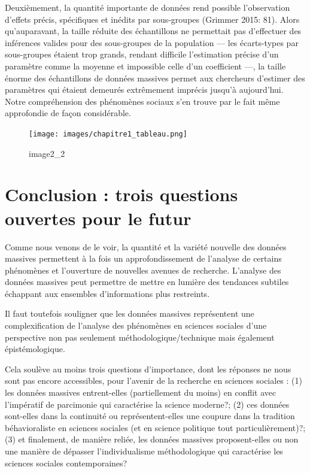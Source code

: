 \documentclass[
  letterpaper,
  DIV=11,
  numbers=noendperiod]{scrreprt}
\begin{document}
Deuxièmement, la quantité importante de données rend possible
l'observation d'effets précis, spécifiques et inédits par sous-groupes
(Grimmer 2015: 81). Alors qu'auparavant, la taille réduite des
échantillons ne permettait pas d'effectuer des inférences valides pour
des sous-groupes de la population --- les écarts-types par sous-groupes
étaient trop grands, rendant difficile l'estimation précise d'un
paramètre comme la moyenne et impossible celle d'un coefficient ---, la
taille énorme des échantillons de données massives permet aux chercheurs
d'estimer des paramètres qui étaient demeurés extrêmement imprécis
jusqu'à aujourd'hui. Notre compréhension des phénomènes sociaux s'en
trouve par le fait même approfondie de façon considérable.

\begin{figure}

{\centering \texttt{[image: images/chapitre1\_tableau.png]}

}

\caption{image2\_2}

\end{figure}

\hypertarget{conclusion-trois-questions-ouvertes-pour-le-futur}{%
\section*{Conclusion : trois questions ouvertes pour le
futur}\label{conclusion-trois-questions-ouvertes-pour-le-futur}}


Comme nous venons de le voir, la quantité et la variété nouvelle des
données massives permettent à la fois un approfondissement de l'analyse
de certains phénomènes et l'ouverture de nouvelles avenues de recherche.
L'analyse des données massives peut permettre de mettre en lumière des
tendances subtiles échappant aux ensembles d'informations plus
restreints.

Il faut toutefois souligner que les données massives représentent une
complexification de l'analyse des phénomènes en sciences sociales d'une
perspective non pas seulement méthodologique/technique mais également
épistémologique.

Cela soulève au moins trois questions d'importance, dont les réponses ne
nous sont pas encore accessibles, pour l'avenir de la recherche en
sciences sociales : (1) les données massives entrent-elles
(partiellement du moins) en conflit avec l'impératif de parcimonie qui
caractérise la science moderne?; (2) ces données sont-elles dans la
continuité ou représentent-elles une coupure dans la tradition
béhavioraliste en sciences sociales (et en science politique tout
particulièrement)?; (3) et finalement, de manière reliée, les données
massives proposent-elles ou non une manière de dépasser l'individualisme
méthodologique qui caractérise les sciences sociales contemporaines?
\end{document}
